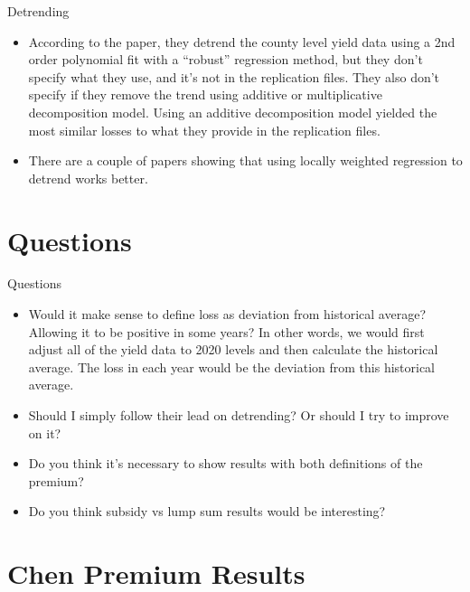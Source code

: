 \documentclass{beamer}
\begin{document}
\begin{frame}{Detrending}
    \begin{itemize}
        \item According to the paper, they detrend the county level yield data using a 2nd order polynomial fit with a ``robust'' regression method, but they don't specify what they use, and it's not in the replication files. They also don't specify if they remove the trend using additive or multiplicative decomposition model. Using an additive decomposition model yielded the most similar losses to what they provide in the replication files. 
        \item There are a couple of papers showing that using locally weighted regression to detrend works better. 
    \end{itemize}
    
\end{frame}

\section*{Questions}
\begin{frame}{Questions}
    \begin{itemize}
        \item Would it make sense to define loss as deviation from historical average? Allowing it to be positive in some years? In other words, we would first adjust all of the yield data to 2020 levels and then calculate the historical average. The loss in each year would be the deviation from this historical average. 
        \item Should I simply follow their lead on detrending? Or should I try to improve on it?
        \item Do you think it's necessary to show results with both definitions of the premium?
        \item Do you think subsidy vs lump sum results would be interesting?
    \end{itemize}
\end{frame}

\section*{Chen Premium Results}
\end{document}
